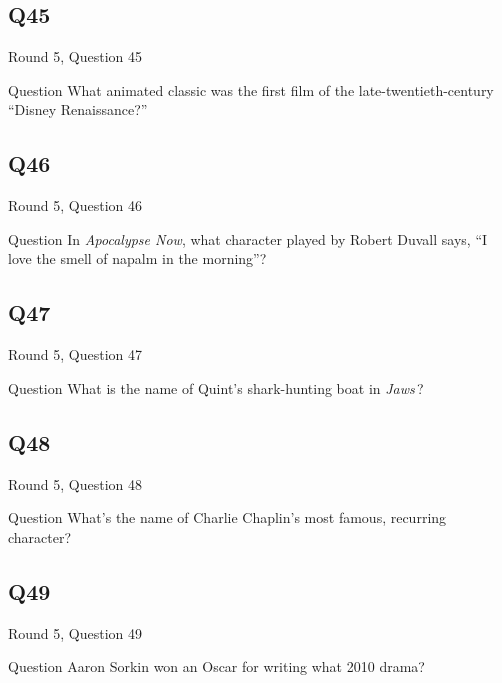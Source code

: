 \documentclass[11pt]{beamer}
\begin{document}
\subsection*{Q45}
\begin{frame}[t]{Round 5, Question 45}
\vspace{2em}
\begin{block}{Question}
What animated classic was the first film of the late-twentieth-century ``Disney Renaissance?''
\end{block}
\end{frame}
    

\subsection*{Q46}
\begin{frame}[t]{Round 5, Question 46}
\vspace{2em}
\begin{block}{Question}
In \emph{Apocalypse Now}, what character played by Robert Duvall says, ``I love the smell of napalm in the morning''?
\end{block}
\end{frame}
    

\subsection*{Q47}
\begin{frame}[t]{Round 5, Question 47}
\vspace{2em}
\begin{block}{Question}
What is the name of Quint's shark-hunting boat in \emph{Jaws}\,?
\end{block}
\end{frame}
    

\subsection*{Q48}
\begin{frame}[t]{Round 5, Question 48}
\vspace{2em}
\begin{block}{Question}
What's the name of Charlie Chaplin's most famous, recurring character?
\end{block}
\end{frame}
    

\subsection*{Q49}
\begin{frame}[t]{Round 5, Question 49}
\vspace{2em}
\begin{block}{Question}
Aaron Sorkin won an Oscar for writing what 2010 drama?
\end{block}
\end{frame}
    
\end{document}
